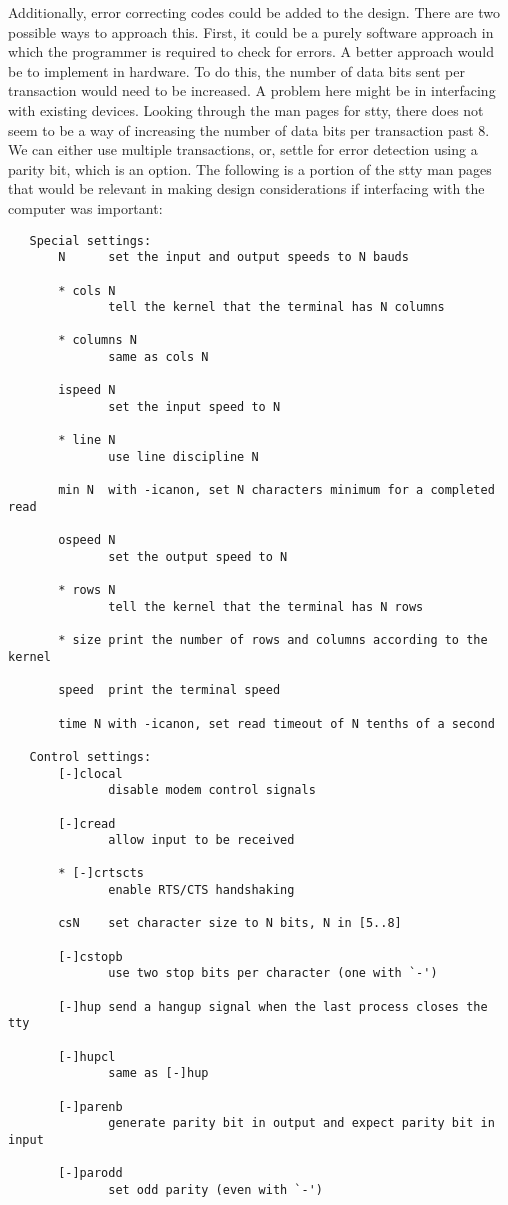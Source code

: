 \documentclass[12pt, a4paper]{article}
\begin{document}
Additionally, error correcting codes could be added to the design. There are two possible ways to approach this. First, it
could be a purely software approach in which the programmer is required to check for errors. A better approach would be to
implement in hardware. To do this, the number of data bits sent per transaction would need to be increased. A problem here
might be in interfacing with existing devices. Looking through the man pages for stty, there does not seem to be a way
of increasing the number of data bits per transaction past 8. We can either use multiple transactions, or, settle for
error detection using a parity bit, which is an option. The following is a portion of the stty man pages that would
be relevant in making design considerations if interfacing with the computer was important:
\begin{verbatim}
   Special settings:
       N      set the input and output speeds to N bauds

       * cols N
              tell the kernel that the terminal has N columns

       * columns N
              same as cols N

       ispeed N
              set the input speed to N

       * line N
              use line discipline N

       min N  with -icanon, set N characters minimum for a completed read

       ospeed N
              set the output speed to N

       * rows N
              tell the kernel that the terminal has N rows

       * size print the number of rows and columns according to the kernel

       speed  print the terminal speed

       time N with -icanon, set read timeout of N tenths of a second

   Control settings:
       [-]clocal
              disable modem control signals

       [-]cread
              allow input to be received

       * [-]crtscts
              enable RTS/CTS handshaking

       csN    set character size to N bits, N in [5..8]

       [-]cstopb
              use two stop bits per character (one with `-')

       [-]hup send a hangup signal when the last process closes the tty

       [-]hupcl
              same as [-]hup

       [-]parenb
              generate parity bit in output and expect parity bit in input

       [-]parodd
              set odd parity (even with `-')
\end{verbatim}
\end{document}
